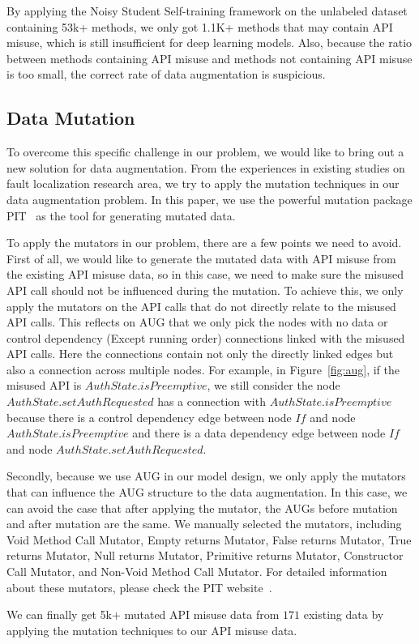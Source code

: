 By applying the Noisy Student Self-training framework on the unlabeled dataset containing 53k+ methods, we only got 1.1K+ methods that may contain API misuse, which is still insufficient for deep learning models. Also, because the ratio between methods containing API misuse and methods not containing API misuse is too small, the correct rate of data augmentation is suspicious.

\subsection{Data Mutation}

To overcome this specific challenge in our problem, we would like to bring out a new solution for data augmentation. From the experiences in existing studies on fault localization research area, we try to apply the mutation techniques in our data augmentation problem. In this paper, we use the powerful mutation package PIT~\cite{PIT} as the tool for generating mutated data.

To apply the mutators in our problem, there are a few points we need to avoid. First of all, we would like to generate the mutated data with API misuse from the existing API misuse data, so in this case, we need to make sure the misused API call should not be influenced during the mutation. To achieve this, we only apply the mutators on the API calls that do not directly relate to the misused API calls. This reflects on AUG that we only pick the nodes with no data or control dependency (Except running order) connections linked with the misused API calls. Here the connections contain not only the directly linked edges but also a connection across multiple nodes. For example, in Figure~\ref{fig:aug}, if the misused API is $AuthState.isPreemptive$, we still consider the node $AuthState.setAuthRequested$ has a connection with $AuthState.isPreemptive$ because there is a control dependency edge between node $If$ and node $AuthState.isPreemptive$ and there is a data dependency edge between node $If$ and node $AuthState.setAuthRequested$.

Secondly, because we use AUG in our model design, we only apply the mutators that can influence the AUG structure to the data augmentation. In this case, we can avoid the case that after applying the mutator, the AUGs before mutation and after mutation are the same. We manually selected the mutators, including Void Method Call Mutator, Empty returns Mutator, False returns Mutator, True returns Mutator, Null returns Mutator, Primitive returns Mutator, Constructor Call Mutator, and Non-Void Method Call Mutator. For detailed information about these mutators, please check the PIT website~\cite{PIT}.

We can finally get 5k+ mutated API misuse data from $171$ existing data by applying the mutation techniques to our API misuse data. 